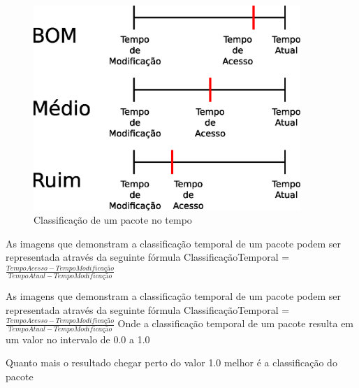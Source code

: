 \begin{frame}

    \begin{figure}[h]
      \centering
      \includegraphics[width=0.9\textwidth]{figura/barra_temporal_04.eps}
      \caption{Classificação de um pacote no tempo}
      \label{fig:barra_temporal}
    \end{figure}

\end{frame}


\begin{frame}

    As imagens que demonstram a classificação temporal de um pacote
podem ser representada através da seguinte fórmula
    \newline
    \newline
    ClassificaçãoTemporal = $\frac{TempoAcesso - TempoModificação}{TempoAtual -
    TempoModificação}$

\end{frame}


\begin{frame}

    As imagens que demonstram a classificação temporal de um pacote
podem ser representada através da seguinte fórmula
    \newline
    \newline
    ClassificaçãoTemporal = $\frac{TempoAcesso - TempoModificação}{TempoAtual -
    TempoModificação}$
    \newline
    \newline
    Onde a classificação temporal de um pacote resulta em um valor
no intervalo de 0.0 a 1.0

    Quanto mais o resultado chegar perto do valor 1.0 melhor
é a classificação do pacote

\end{frame}


